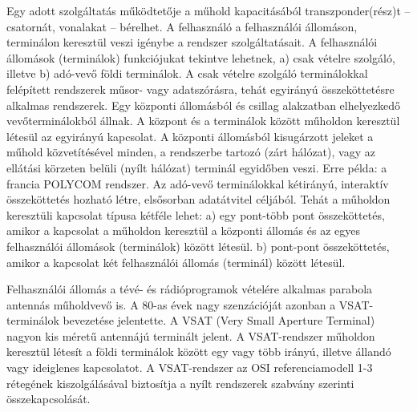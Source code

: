 Egy adott szolgáltatás működtetője a műhold kapacitásából transzponder(rész)t -- csatornát, vonalakat -- bérelhet. A felhasználó a felhasználói állomáson, terminálon keresztül veszi igénybe a rendszer szolgáltatásait. A felhasználói állomások (terminálok) funkciójukat tekintve lehetnek, a) csak vételre szolgáló, illetve b) adó-vevő földi terminálok. A csak vételre szolgáló terminálokkal felépített rendszerek műsor- vagy adatszórásra, tehát egyirányú összeköttetésre alkalmas rendszerek. Egy központi állomásból és csillag alakzatban elhelyezkedő vevőterminálokból állnak. A központ és a terminálok között műholdon keresztül létesül az egyirányú
kapcsolat. A központi állomásból kisugárzott jeleket a műhold közvetítésével
minden, a rendszerbe tartozó (zárt hálózat), vagy az ellátási körzeten belüli
(nyílt hálózat) terminál egyidőben veszi. Erre példa: a francia POLYCOM
rendszer. Az adó-vevő terminálokkal kétirányú, interaktív összeköttetés hozható létre, elsősorban adatátvitel céljából. Tehát a műholdon keresztüli kapcsolat típusa kétféle lehet:
a) egy pont-több pont összeköttetés, amikor a kapcsolat a műholdon keresztül a
központi állomás és az egyes felhasználói állomások (terminálok) között létesül.
b) pont-pont összeköttetés, amikor a kapcsolat két felhasználói állomás (terminál) között létesül.

Felhasználói állomás a tévé- és rádióprogramok vételére alkalmas parabola
antennás műholdvevő is. A 80-as évek nagy szenzációját azonban a VSAT-
terminálok bevezetése jelentette. A VSAT (Very Small Aperture Terminal) nagyon kis méretű antennájú terminált jelent.
A VSAT-rendszer műholdon keresztül létesít a földi terminálok között egy vagy
több irányú, illetve állandó vagy ideiglenes kapcsolatot. A VSAT-rendszer az
OSI referenciamodell 1-3 rétegének kiszolgálásával biztosítja a nyílt rendszerek
szabvány szerinti összekapcsolását.

